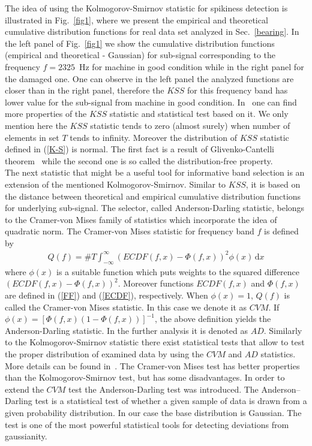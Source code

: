 \documentclass[3p,times]{elsarticle}
\begin{document}
The idea of using the Kolmogorov-Smirnov statistic for spikiness detection is illustrated in Fig.~\ref{fig1}, where we present the empirical and theoretical cumulative distribution functions for real data set analyzed in Sec.~\ref{bearing}. In the left panel of Fig.~\ref{fig1} we show the cumulative distribution functions (empirical and theoretical - Gaussian) for sub-signal corresponding to the frequency $f=2325$~Hz for machine in good condition while in the right panel for the damaged one. One can observe in the left panel the analyzed functions are closer than in the right panel, therefore the $KSS$ for this frequency band has lower value for the sub-signal from machine in good condition. In~\cite{bib05,bib06} one can find more properties of the $KSS$ statistic and statistical test based on it. We only mention here the $KSS$ statistic tends to zero (almost surely) when number of elements in set $T$ tends to infinity. Moreover the distribution of $KSS$ statistic defined in (\ref{K-S}) is normal. The first fact is a result of Glivenko-Cantelli theorem~\cite{gli} while the second one is so called the distribution-free property.\\
The next statistic that might be a useful tool for informative band selection is an extension of the mentioned Kolmogorov-Smirnov. Similar to $KSS$, it is based on the distance between theoretical and empirical cumulative distribution functions for underlying sub-signal. The selector, called Anderson-Darling statistic, belongs to the Cramer-von Mises family of statistics which incorporate the idea of quadratic norm. The Cramer-von Mises statistic for frequency band $f$ is defined by~\cite{bib06}
\begin{eqnarray}
Q(f)=\#T\int^{\infty}_{-\infty} \! \left(ECDF\left(f,x\right) - \Phi\left(f,x\right)\right)^2 \phi \left(x\right) \, \mathrm{d} x
\end{eqnarray}
where $\phi \left(x\right)$ is a suitable function which puts weights to the squared difference $\left(ECDF\left(f,x \right) - \Phi\left(f,x\right)\right)^2$. Moreover functions $ECDF(f,x)$ and $\Phi(f,x)$ are defined in (\ref{FF}) and (\ref{ECDF}), respectively. When $\phi(x)=1$, $Q(f)$ is called the Cramer-von Mises statistic. In this case we denote it as $CVM$. If $\phi\left(x\right)=\left[ \Phi\left(f,x\right) \left( 1-\Phi\left(f,x\right) \right) \right]^{-1}$, the above definition yields the Anderson-Darling statistic.  In the further analysis it is denoted as $AD$. Similarly to the Kolmogorov-Smirnov statistic there exist statistical tests that allow to test the proper distribution of examined data by using the $CVM$ and $AD$ statistics. More details can be found in~\cite{bib07,bib08,bib09}. The Cramer-von Mises test has better properties than the Kolmogorov-Smirnov test, but has some disadvantages. In order to extend the $CVM$ test the Anderson-Darling test was introduced. The Anderson--Darling test is a statistical test of whether a given sample of data is drawn from a given probability distribution. In our case the base distribution is Gaussian. The test is one of the most powerful statistical tools for detecting deviations from gaussianity.\\
\end{document}
